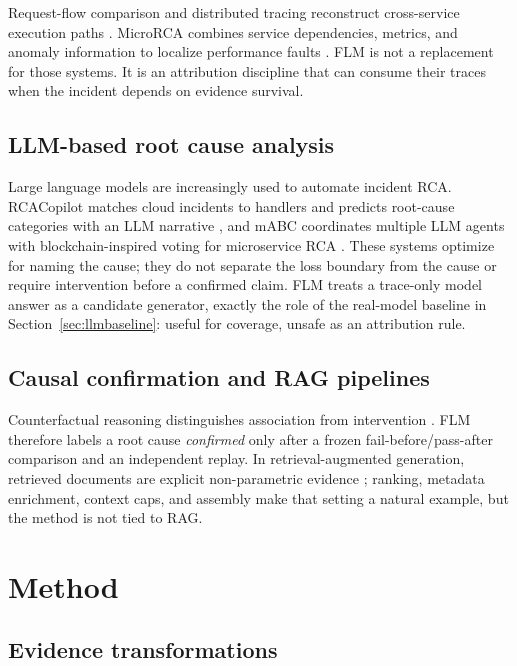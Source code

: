 \documentclass[10pt]{article}
\begin{document}
Request-flow comparison and distributed tracing reconstruct cross-service execution paths \cite{sambasivan2011requestflows,sigelman2010dapper}. MicroRCA combines service dependencies, metrics, and anomaly information to localize performance faults \cite{wu2020microrca}. FLM is not a replacement for those systems. It is an attribution discipline that can consume their traces when the incident depends on evidence survival.

\subsection{LLM-based root cause analysis}

Large language models are increasingly used to automate incident RCA. RCACopilot matches cloud incidents to handlers and predicts root-cause categories with an LLM narrative \cite{chen2024rcacopilot}, and mABC coordinates multiple LLM agents with blockchain-inspired voting for microservice RCA \cite{zhang2024mabc}. These systems optimize for naming the cause; they do not separate the loss boundary from the cause or require intervention before a confirmed claim. FLM treats a trace-only model answer as a candidate generator, exactly the role of the real-model baseline in Section~\ref{sec:llmbaseline}: useful for coverage, unsafe as an attribution rule.

\subsection{Causal confirmation and RAG pipelines}

Counterfactual reasoning distinguishes association from intervention \cite{pearl2009causality}. FLM therefore labels a root cause \emph{confirmed} only after a frozen fail-before/pass-after comparison and an independent replay. In retrieval-augmented generation, retrieved documents are explicit non-parametric evidence \cite{lewis2020rag}; ranking, metadata enrichment, context caps, and assembly make that setting a natural example, but the method is not tied to RAG.

\section{Method}

\subsection{Evidence transformations}
\end{document}
